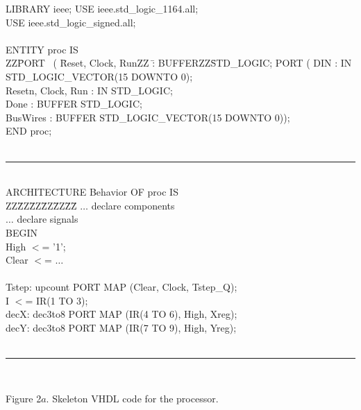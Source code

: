 \documentclass[epsfig,10pt,fullpage]{article}
\begin{document}
\begin{center}
\begin{minipage}[t]{12.5 cm}
\begin{tabbing}
LIBRARY ieee;
USE ieee.std\_logic\_1164.all;\\
USE ieee.std\_logic\_signed.all;\\
~\\
ENTITY proc IS\\
ZZ\=PORT ~( \=Reset, Clock, RunZZ \=: BUFFERZZ\=STD\_LOGIC;\kill
\>PORT ( \>DIN \>: IN \>STD\_LOGIC\_VECTOR(15 DOWNTO 0);\\
\>\>Resetn, Clock, Run \>: IN \>STD\_LOGIC;\\
\>\>Done \>: BUFFER \>STD\_LOGIC;\\
\>\>BusWires \>: BUFFER	\>STD\_LOGIC\_VECTOR(15 DOWNTO 0));\\
END proc;\\
~\rule{5.0in}{0in}
~\\
ARCHITECTURE Behavior OF proc IS\\
ZZ\=ZZ\=ZZ\=ZZ\=ZZ\=ZZ\=\kill
\>$\ldots$ declare components\\
\>$\ldots$ declare signals\\
BEGIN\\
\>High $<$= '1';\\
\>Clear $<$= $\ldots$\\\\
\>Tstep: upcount PORT MAP (Clear, Clock, Tstep\_Q);\\
\>I $<$= IR(1 TO 3);\\
\>decX: dec3to8 PORT MAP (IR(4 TO 6), High, Xreg);\\
\>decY: dec3to8 PORT MAP (IR(7 TO 9), High, Yreg);\\
~\rule{5.0in}{0in}\\
\end{tabbing}
\end{minipage}
\end{center}

\begin{center}
Figure 2$a$. Skeleton VHDL code for the processor.
\end{center}
\end{document}
